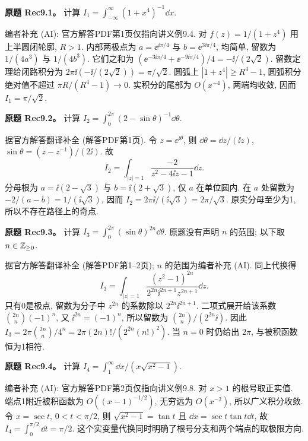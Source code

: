 \begin{exercise}
\textbf{原题 Rec9.1。}\label{ass:rec9-1}
计算 $I_1=\int_{-\infty}^\infty(1+x^4)^{-1}\dd x$.
\end{exercise}
\begin{solution}
编者补充 (AI): 官方解答PDF第1页仅指向讲义例9.4. 对 $f(z)=1/(1+z^4)$ 用上半圆闭轮廓, $R>1$. 内部两极点为 $a=\ee^{\ii\pi/4}$ 与 $b=\ee^{3\ii\pi/4}$, 均简单, 留数为 $1/(4a^3)$ 与 $1/(4b^3)$. 它们之和为 $(\ee^{-3\ii\pi/4}+\ee^{-9\ii\pi/4})/4=-\ii/(2\sqrt2)$. 留数定理给闭路积分为 $2\pi\ii(-\ii/(2\sqrt2))=\pi/\sqrt2$. 圆弧上 $|1+z^4|\ge R^4-1$, 圆弧积分绝对值不超过 $\pi R/(R^4-1)\to0$. 实积分的尾部为 $O(x^{-4})$, 两端均收敛, 因而 $I_1=\pi/\sqrt2$.
\end{solution}
\begin{exercise}
\textbf{原题 Rec9.2。}\label{ass:rec9-2}
计算 $I_2=\int_0^{2\pi}(2-\sin\theta)^{-1}\dd\theta$.
\end{exercise}
\begin{solution}
据官方解答翻译补全 (解答PDF第1页). 令 $z=\ee^{\ii\theta}$, 则 $\dd\theta=\dd z/(\ii z)$, $\sin\theta=(z-z^{-1})/(2\ii)$. 故
\[
I_2=\int_{|z|=1}\frac{-2}{z^2-4\ii z-1}\dd z.
\]
分母根为 $a=\ii(2-\sqrt3)$ 与 $b=\ii(2+\sqrt3)$, 仅 $a$ 在单位圆内. 在 $a$ 处留数为 $-2/(a-b)=1/(\ii\sqrt3)$, 因而 $I_2=2\pi\ii/(\ii\sqrt3)=2\pi/\sqrt3$. 原实分母至少为1, 所以不存在路径上的奇点.
\end{solution}
\begin{exercise}
\textbf{原题 Rec9.3。}\label{ass:rec9-3}
计算 $I_3=\int_0^{2\pi}(\sin\theta)^{2n}\dd\theta$. 原题没有声明 $n$ 的范围; 以下取 $n\in\mathbb Z_{\ge0}$.
\end{exercise}
\begin{solution}
据官方解答翻译补全 (解答PDF第1--2页); $n$ 的范围为编者补充 (AI). 同上代换得
\[
I_3=\int_{|z|=1}\frac{(z^2-1)^{2n}}{2^{2n}\ii^{2n+1}z^{2n+1}}\dd z.
\]
只有0是极点, 留数为分子中 $z^{2n}$ 的系数除以 $2^{2n}\ii^{2n+1}$. 二项式展开给该系数 $\binom{2n}{n}(-1)^n$, 又 $\ii^{2n}=(-1)^n$, 所以留数为 $\binom{2n}{n}/(2^{2n}\ii)$. 因此 $I_3=2\pi\binom{2n}{n}/4^n=2\pi(2n)!/(2^{2n}(n!)^2)$. 当 $n=0$ 时仍给出 $2\pi$, 与被积函数恒为1相符.
\end{solution}
\begin{exercise}
\textbf{原题 Rec9.4。}\label{ass:rec9-4}
计算 $I_4=\int_1^\infty\dd x/(x\sqrt{x^2-1})$.
\end{exercise}
\begin{solution}
编者补充 (AI): 官方解答PDF第2页仅指向讲义例9.8. 对 $x>1$ 的根号取正实值. 端点1附近被积函数为 $O((x-1)^{-1/2})$, 无穷远为 $O(x^{-2})$, 所以广义积分收敛. 令 $x=\sec t$, $0<t<\pi/2$, 则 $\sqrt{x^2-1}=\tan t$ 且 $\dd x=\sec t\tan t\dd t$, 故 $I_4=\int_0^{\pi/2}\dd t=\pi/2$. 这个实变量代换同时明确了根号分支和两个端点的取极限方向.
\end{solution}
